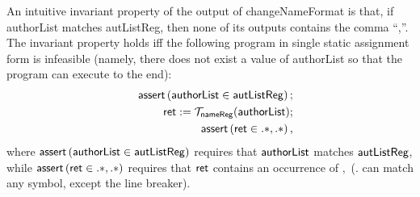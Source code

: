 An intuitive invariant property of the output of {\sf changeNameFormat} is that, if {\sf authorList} matches {\sf autListReg}, then none of its outputs contains the comma ``,''. The invariant property holds iff the following program in single static assignment form is infeasible (namely, there does not exist a value of {\sf authorList} so that the program can execute to the end):
%
\begin{eqnarray}\label{eqn:exmp}
& & \textsf{assert}\left(\sf authorList \in autListReg\right);\nonumber \\
& & \sf ret  := \sf  \mathcal{T}_{nameReg}(authorList);\nonumber \\
& &  \textsf{assert}\left(\sf ret \in .*,.*\right),
\end{eqnarray}
%
where $\textsf{assert}\left(\sf authorList \in autListReg\right)$ requires that $\sf authorList$ matches $\sf autListReg$, while $\textsf{assert}\left(\sf ret \in .*,.*\right)$ requires that $\sf ret$ contains an occurrence of $,$ ($.$ can match any symbol, except the line breaker).

